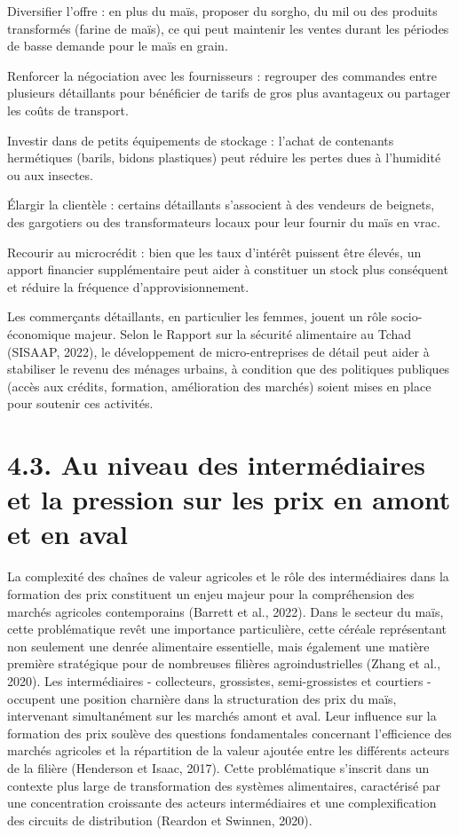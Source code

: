 \documentclass[12pt,oneside]{report}
\begin{document}
Diversifier l’offre : en plus du maïs, proposer du sorgho, du mil ou des produits transformés (farine de maïs), ce qui peut maintenir les ventes durant les périodes de basse demande pour le maïs en grain.

Renforcer la négociation avec les fournisseurs : regrouper des commandes entre plusieurs détaillants pour bénéficier de tarifs de gros plus avantageux ou partager les coûts de transport.

Investir dans de petits équipements de stockage : l’achat de contenants hermétiques (barils, bidons plastiques) peut réduire les pertes dues à l’humidité ou aux insectes.

Élargir la clientèle : certains détaillants s’associent à des vendeurs de beignets, des gargotiers ou des transformateurs locaux pour leur fournir du maïs en vrac.

Recourir au microcrédit : bien que les taux d’intérêt puissent être élevés, un apport financier supplémentaire peut aider à constituer un stock plus conséquent et réduire la fréquence d’approvisionnement.

Les commerçants détaillants, en particulier les femmes, jouent un rôle socio-économique majeur. Selon le Rapport sur la sécurité alimentaire au Tchad (SISAAP, 2022), le développement de micro-entreprises de détail peut aider à stabiliser le revenu des ménages urbains, à condition que des politiques publiques (accès aux crédits, formation, amélioration des marchés) soient mises en place pour soutenir ces activités.

\section{4.3. Au niveau des intermédiaires et la pression sur les prix en amont et en aval}
La complexité des chaînes de valeur agricoles  et le rôle des intermédiaires dans la formation des prix constituent un enjeu majeur pour la compréhension des marchés agricoles contemporains (Barrett et al., 2022). Dans le secteur du maïs, cette problématique revêt une importance particulière, cette céréale représentant non seulement une denrée alimentaire essentielle, mais également une matière première stratégique pour de nombreuses filières agroindustrielles (Zhang et al., 2020). Les intermédiaires - collecteurs, grossistes, semi-grossistes et courtiers - occupent une position charnière dans la structuration des prix du maïs, intervenant simultanément sur les marchés amont et aval. Leur influence sur la formation des prix soulève des questions fondamentales concernant l'efficience des marchés agricoles et la répartition de la valeur ajoutée entre les différents acteurs de la filière (Henderson et Isaac, 2017). Cette problématique s'inscrit dans un contexte plus large de transformation des systèmes alimentaires, caractérisé par une concentration croissante des acteurs intermédiaires et une complexification des circuits de distribution (Reardon et Swinnen, 2020).
\end{document}
